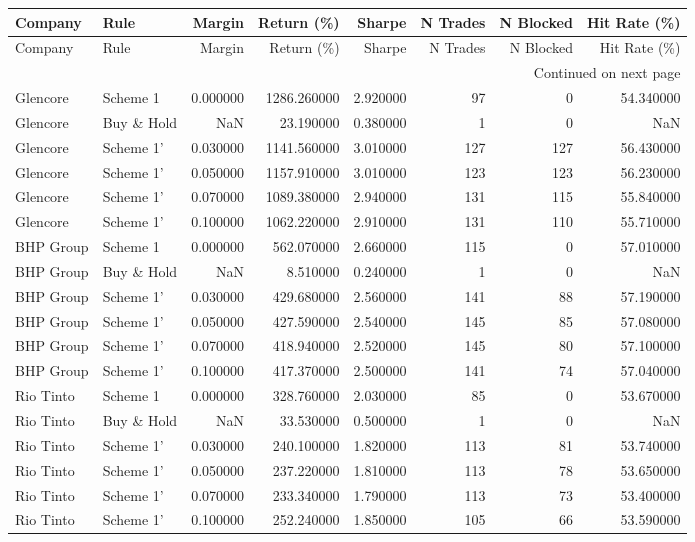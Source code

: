 \begin{longtable}{llrrrrrr}
\toprule
Company & Rule & Margin & Return (\%) & Sharpe & N Trades & N Blocked & Hit Rate (\%) \\
\midrule
\endfirsthead
\toprule
Company & Rule & Margin & Return (\%) & Sharpe & N Trades & N Blocked & Hit Rate (\%) \\
\midrule
\endhead
\midrule
\multicolumn{8}{r}{Continued on next page} \\
\midrule
\endfoot
\bottomrule
\endlastfoot
Glencore & Scheme 1 & 0.000000 & 1286.260000 & 2.920000 & 97 & 0 & 54.340000 \\
Glencore & Buy \& Hold & NaN & 23.190000 & 0.380000 & 1 & 0 & NaN \\
Glencore & Scheme 1' & 0.030000 & 1141.560000 & 3.010000 & 127 & 127 & 56.430000 \\
Glencore & Scheme 1' & 0.050000 & 1157.910000 & 3.010000 & 123 & 123 & 56.230000 \\
Glencore & Scheme 1' & 0.070000 & 1089.380000 & 2.940000 & 131 & 115 & 55.840000 \\
Glencore & Scheme 1' & 0.100000 & 1062.220000 & 2.910000 & 131 & 110 & 55.710000 \\
BHP Group & Scheme 1 & 0.000000 & 562.070000 & 2.660000 & 115 & 0 & 57.010000 \\
BHP Group & Buy \& Hold & NaN & 8.510000 & 0.240000 & 1 & 0 & NaN \\
BHP Group & Scheme 1' & 0.030000 & 429.680000 & 2.560000 & 141 & 88 & 57.190000 \\
BHP Group & Scheme 1' & 0.050000 & 427.590000 & 2.540000 & 145 & 85 & 57.080000 \\
BHP Group & Scheme 1' & 0.070000 & 418.940000 & 2.520000 & 145 & 80 & 57.100000 \\
BHP Group & Scheme 1' & 0.100000 & 417.370000 & 2.500000 & 141 & 74 & 57.040000 \\
Rio Tinto & Scheme 1 & 0.000000 & 328.760000 & 2.030000 & 85 & 0 & 53.670000 \\
Rio Tinto & Buy \& Hold & NaN & 33.530000 & 0.500000 & 1 & 0 & NaN \\
Rio Tinto & Scheme 1' & 0.030000 & 240.100000 & 1.820000 & 113 & 81 & 53.740000 \\
Rio Tinto & Scheme 1' & 0.050000 & 237.220000 & 1.810000 & 113 & 78 & 53.650000 \\
Rio Tinto & Scheme 1' & 0.070000 & 233.340000 & 1.790000 & 113 & 73 & 53.400000 \\
Rio Tinto & Scheme 1' & 0.100000 & 252.240000 & 1.850000 & 105 & 66 & 53.590000 \\

\end{longtable}
